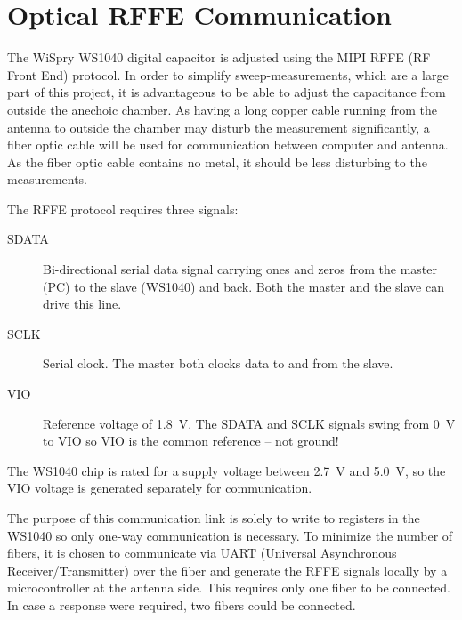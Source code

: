 \section{Optical RFFE Communication}
\label{cha:optical_rffe_comm}
The WiSpry WS1040 digital capacitor is adjusted using the MIPI RFFE (RF Front End) protocol. In order to simplify sweep-measurements, which are a large part of this project, it is advantageous to be able to adjust the capacitance from outside the anechoic chamber. As having a long copper cable running from the antenna to outside the chamber may disturb the measurement significantly, a fiber optic cable will be used for communication between computer and antenna. As the fiber optic cable contains no metal, it should be less disturbing to the measurements.

The RFFE protocol requires three signals:
\begin{description}
    \item[SDATA] Bi-directional serial data signal carrying ones and zeros from the master (PC) to the slave (WS1040) and back. Both the master and the slave can drive this line.
    \item[SCLK] Serial clock. The master both clocks data to and from the slave.
    \item[VIO] Reference voltage of \SI{1.8}{V}. The SDATA and SCLK signals swing from \SI{0}{V} to VIO so VIO is the common reference -- not ground!
\end{description}
The WS1040 chip is rated for a supply voltage between \SI{2.7}{V} and \SI{5.0}{V}, so the VIO voltage is generated separately for communication.

The purpose of this communication link is solely to write to registers in the WS1040 so only one-way communication is necessary. To minimize the number of fibers, it is chosen to communicate via UART (Universal Asynchronous Receiver/Transmitter) over the fiber and generate the RFFE signals locally by a microcontroller at the antenna side. This requires only one fiber to be connected. In case a response were required, two fibers could be connected.

